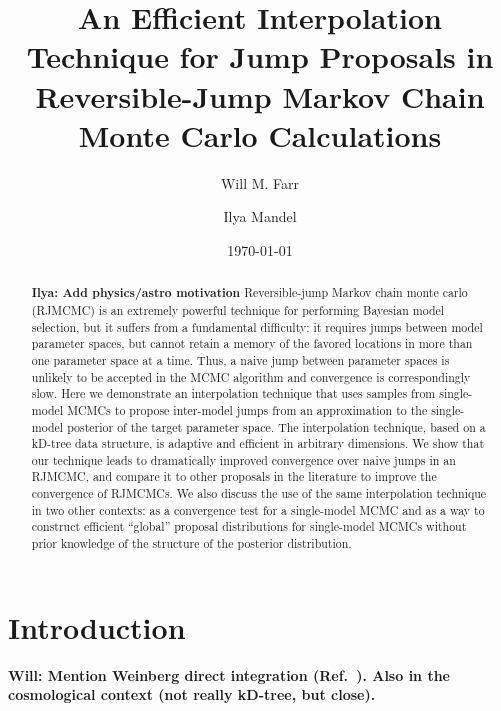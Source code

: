 \documentclass[prd,preprint]{revtex4}
\newcommand{\ilya}[1]{{\color{red} \bf Ilya: #1}}
\newcommand{\will}[1]{{\color{blue} \bf Will: #1}}
\begin{document}
\title{An Efficient Interpolation Technique for Jump Proposals in
  Reversible-Jump Markov Chain Monte Carlo Calculations}

\date{\today}

\author{Will M. Farr}


\author{Ilya Mandel}


\begin{abstract}
  \ilya{Add physics/astro motivation} Reversible-jump Markov chain
  monte carlo (RJMCMC) is an extremely powerful technique for
  performing Bayesian model selection, but it suffers from a
  fundamental difficulty: it requires jumps between model parameter
  spaces, but cannot retain a memory of the favored locations in more
  than one parameter space at a time.  Thus, a naive jump between
  parameter spaces is unlikely to be accepted in the MCMC algorithm
  and convergence is correspondingly slow.  Here we demonstrate an
  interpolation technique that uses samples from single-model MCMCs to
  propose inter-model jumps from an approximation to the single-model
  posterior of the target parameter space.  The interpolation
  technique, based on a kD-tree data structure, is adaptive and
  efficient in arbitrary dimensions.  We show that our technique leads
  to dramatically improved convergence over naive jumps in an RJMCMC,
  and compare it to other proposals in the literature to improve the
  convergence of RJMCMCs.  We also discuss the use of the same
  interpolation technique in two other contexts: as a convergence test
  for a single-model MCMC and as a way to construct efficient
  ``global'' proposal distributions for single-model MCMCs without
  prior knowledge of the structure of the posterior distribution.
\end{abstract}

\maketitle

\section{Introduction}

\will{Mention Weinberg direct integration (Ref.~\cite{Weinberg2009}).
  Also \cite{Ascasibar2005} in the cosmological context (not really
  kD-tree, but close).}
\end{document}

